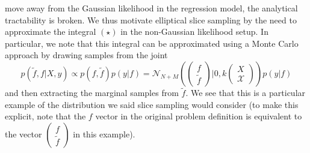 \documentclass[12pt]{article}
\begin{document}
move away from the Gaussian likelihood in the regression model, the analytical tractability is broken. We thus motivate elliptical slice sampling by the need to approximate the integral 
$(\star)$ in the non-Gaussian likelihood setup. In particular, we note that this integral can be approximated using a Monte Carlo approach by drawing samples from the joint
\[p(\tilde{f}, f|X, y) \propto p(f, \tilde{f}) p(y|f) = \mathcal{N}_{N + M}\left(\begin{pmatrix} f \\ \tilde{f}\end{pmatrix} \bigg|0, k\begin{pmatrix} X \\ \mathcal{X}\end{pmatrix}\right)p(y|f)\]
 and then extracting the marginal samples from $\tilde{f}$. 
 We see that this is a particular example of the distribution we said slice sampling would consider (to make this explicit, note that the $f$ vector in the original problem definition 
 is equivalent to the vector $\begin{pmatrix} f \\ \tilde{f} \end{pmatrix}$ in this example). 
\end{document}
